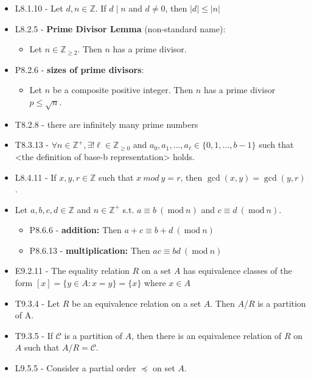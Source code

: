 \documentclass[10pt, landscape]{article}
\renewcommand{\bf}[1]{\textbf{#1}}
\newcommand{\Mod}[1]{\ \mathrm{mod}\ #1}
\begin{document}
\begin{multicols*}{3}
\begin{itemize}
        \item L8.1.10 - Let $d, n \in \mathbb{Z}$. If $d \mid n$ and $d \neq 0$, then $\vert d \vert \leq \vert n \vert$ 
        \item L8.2.5 - \bf{Prime Divisor Lemma} (non-standard name):
        \begin{itemize}
            \item Let $n \in \mathbb{Z}_{\geq 2}$. Then $n$ has a prime divisor.
        \end{itemize}
        \item P8.2.6 - \bf{sizes of prime divisors}: 
        \begin{itemize}
            \item Let $n$ be a composite positive integer. Then $n$ has a prime divisor $p \leq \sqrt{n}$.
        \end{itemize}
        \item T8.2.8 - there are infinitely many prime numbers
        \item T8.3.13 - $\forall n \in \mathbb{Z}^+, \exists ! \ell \in \mathbb{Z}_{\geq 0}$ and $a_0, a_1, \dots, a_\ell \in \{0, 1, \dots, b - 1\}$ 
        such that <the definition of base-b representation> holds.
        \item L8.4.11 - If $x, y, r \in \mathbb{Z}$ such that $x \ mod \ y = r$, then $\gcd(x, y) = \gcd(y, r)$.
        \item Let $a, b, c, d \in \mathbb{Z}$ and $n \in \mathbb{Z}^+$ s.t. $a \equiv b \ (\Mod{n})$ and $c \equiv d \ (\Mod{n})$. 
        \begin{itemize}
            \item P8.6.6 - \bf{addition: } Then $a + c \equiv b + d \ (\Mod n)$
            \item P8.6.13 - \bf{multiplication: } Then $ac \equiv bd \ (\Mod n)$
        \end{itemize}
        \item E9.2.11 - The equality relation $R$ on a set $A$ has equivalence classes of the form $[x] = \{y \in A : x = y \} = \{x\}$ where $x \in A$
        \item T9.3.4 - Let $R$ be an equivalence relation on a set $A$. Then $A / R$ is a partition of A.
        \item T9.3.5 - If $\mathscr{C}$ is a partition of $A$, then there is an equivalence relation of $R$ on $A$ such that $A/R = \mathscr{C}$.
        \item L9.5.5 - Consider a partial order $\preccurlyeq$ on set $A$. 
        \begin{itemize}

\end{itemize}
\end{itemize}
\end{multicols*}
\end{document}
